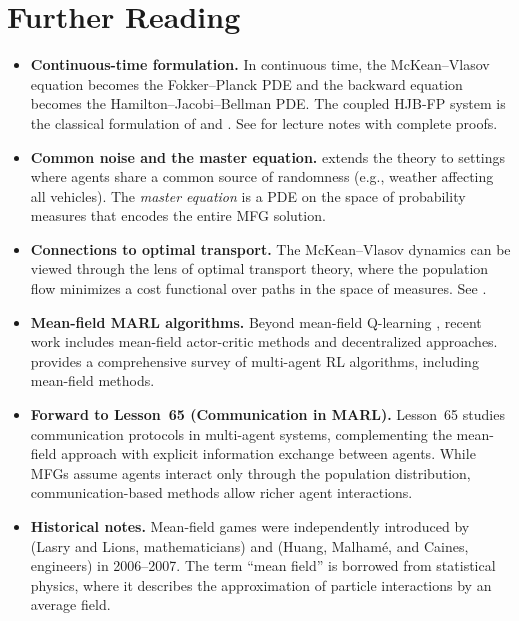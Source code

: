 \documentclass[11pt,a4paper]{article}
\begin{document}
\section{Further Reading}
\label{sec:further-reading}

\begin{itemize}
  \item \textbf{Continuous-time formulation.}
    In continuous time, the McKean--Vlasov equation becomes the
    Fokker--Planck PDE and the backward equation becomes the
    Hamilton--Jacobi--Bellman PDE.  The coupled HJB-FP system is
    the classical formulation of \citet{lasry2007} and
    \citet{huang2006}.  See \citet{cardaliaguet2010} for lecture
    notes with complete proofs.

  \item \textbf{Common noise and the master equation.}
    \citet{carmona2018ii} extends the theory to settings where
    agents share a common source of randomness (e.g., weather
    affecting all vehicles).  The \emph{master equation} is a
    PDE on the space of probability measures that encodes the
    entire MFG solution.

  \item \textbf{Connections to optimal transport.}
    The McKean--Vlasov dynamics can be viewed through the lens
    of optimal transport theory, where the population flow
    minimizes a cost functional over paths in the space of
    measures.  See \citet[Chapter~5]{carmona2018i}.

  \item \textbf{Mean-field MARL algorithms.}
    Beyond mean-field Q-learning \citep{yang2018}, recent work
    includes mean-field actor-critic methods \citep{gu2021} and
    decentralized approaches.  \citet{zhang2021} provides a
    comprehensive survey of multi-agent RL algorithms, including
    mean-field methods.

  \item \textbf{Forward to Lesson~65 (Communication in MARL).}
    Lesson~65 studies communication protocols in multi-agent
    systems, complementing the mean-field approach with explicit
    information exchange between agents.  While MFGs assume
    agents interact only through the population distribution,
    communication-based methods allow richer agent interactions.

  \item \textbf{Historical notes.}
    Mean-field games were independently introduced by
    \citet{lasry2007} (Lasry and Lions, mathematicians) and
    \citet{huang2006} (Huang, Malham\'{e}, and Caines, engineers)
    in 2006--2007.  The term ``mean field'' is borrowed from
    statistical physics, where it describes the approximation of
    particle interactions by an average field.
\end{itemize}


\end{document}
